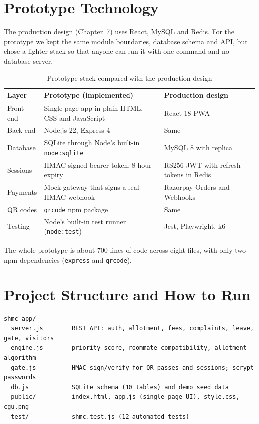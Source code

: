 \documentclass[11pt,a4paper]{report}
\begin{document}
\section{Prototype Technology}
The production design (Chapter~7) uses React, MySQL and Redis. For the prototype we kept the same module boundaries, database schema and API, but chose a lighter stack so that anyone can run it with one command and no database server.

\begin{table}[H]
\centering\small
\caption{Prototype stack compared with the production design}\label{tab:stack}
\begin{tabularx}{\textwidth}{lLL}
\toprule
\textbf{Layer} & \textbf{Prototype (implemented)} & \textbf{Production design}\\
\midrule
Front end & Single-page app in plain HTML, CSS and JavaScript & React 18 PWA\\
Back end & Node.js 22, Express 4 & Same\\
Database & SQLite through Node's built-in \texttt{node:sqlite} & MySQL 8 with replica\\
Sessions & HMAC-signed bearer token, 8-hour expiry & RS256 JWT with refresh tokens in Redis\\
Payments & Mock gateway that signs a real HMAC webhook & Razorpay Orders and Webhooks\\
QR codes & \texttt{qrcode} npm package & Same\\
Testing & Node's built-in test runner (\texttt{node:test}) & Jest, Playwright, k6\\
\bottomrule
\end{tabularx}
\end{table}

The whole prototype is about 700 lines of code across eight files, with only two npm dependencies (\texttt{express} and \texttt{qrcode}).

\section{Project Structure and How to Run}
\begin{lstlisting}
shmc-app/
  server.js        REST API: auth, allotment, fees, complaints, leave, gate, visitors
  engine.js        priority score, roommate compatibility, allotment algorithm
  gate.js          HMAC sign/verify for QR passes and sessions; scrypt passwords
  db.js            SQLite schema (10 tables) and demo seed data
  public/          index.html, app.js (single-page UI), style.css, cgu.png
  test/            shmc.test.js (12 automated tests)
\end{lstlisting}
\end{document}
